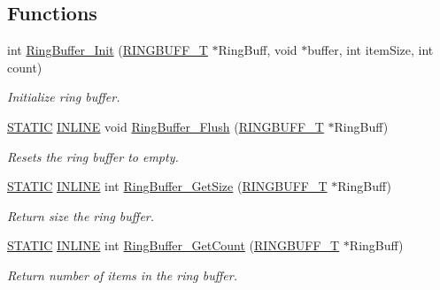 \subsection*{Functions}
\begin{DoxyCompactItemize}
\item 
int \hyperlink{group___ring___buffer_gaaf3bb51f2228ea1bea603e19c7eba5bb}{Ring\+Buffer\+\_\+\+Init} (\hyperlink{struct_r_i_n_g_b_u_f_f___t}{R\+I\+N\+G\+B\+U\+F\+F\+\_\+T} $\ast$Ring\+Buff, void $\ast$buffer, int item\+Size, int count)
\begin{DoxyCompactList}\small\item\em Initialize ring buffer. \end{DoxyCompactList}\item 
\hyperlink{group___l_p_c___types___public___macros_ga10b2d890d871e1489bb02b7e70d9bdfb}{S\+T\+A\+T\+IC} \hyperlink{spifi__18xx__43xx_8h_a2eb6f9e0395b47b8d5e3eeae4fe0c116}{I\+N\+L\+I\+NE} void \hyperlink{group___ring___buffer_ga5f66a5dd980ef03877cf8e0c96ad4ebb}{Ring\+Buffer\+\_\+\+Flush} (\hyperlink{struct_r_i_n_g_b_u_f_f___t}{R\+I\+N\+G\+B\+U\+F\+F\+\_\+T} $\ast$Ring\+Buff)
\begin{DoxyCompactList}\small\item\em Resets the ring buffer to empty. \end{DoxyCompactList}\item 
\hyperlink{group___l_p_c___types___public___macros_ga10b2d890d871e1489bb02b7e70d9bdfb}{S\+T\+A\+T\+IC} \hyperlink{spifi__18xx__43xx_8h_a2eb6f9e0395b47b8d5e3eeae4fe0c116}{I\+N\+L\+I\+NE} int \hyperlink{group___ring___buffer_ga2fc4b40b03afb19c8ea942da3cf3faf1}{Ring\+Buffer\+\_\+\+Get\+Size} (\hyperlink{struct_r_i_n_g_b_u_f_f___t}{R\+I\+N\+G\+B\+U\+F\+F\+\_\+T} $\ast$Ring\+Buff)
\begin{DoxyCompactList}\small\item\em Return size the ring buffer. \end{DoxyCompactList}\item 
\hyperlink{group___l_p_c___types___public___macros_ga10b2d890d871e1489bb02b7e70d9bdfb}{S\+T\+A\+T\+IC} \hyperlink{spifi__18xx__43xx_8h_a2eb6f9e0395b47b8d5e3eeae4fe0c116}{I\+N\+L\+I\+NE} int \hyperlink{group___ring___buffer_ga7b69777c35694637acaf39e6bfcc1822}{Ring\+Buffer\+\_\+\+Get\+Count} (\hyperlink{struct_r_i_n_g_b_u_f_f___t}{R\+I\+N\+G\+B\+U\+F\+F\+\_\+T} $\ast$Ring\+Buff)
\begin{DoxyCompactList}\small\item\em Return number of items in the ring buffer. \end{DoxyCompactList}\item 

\end{DoxyCompactItemize}
